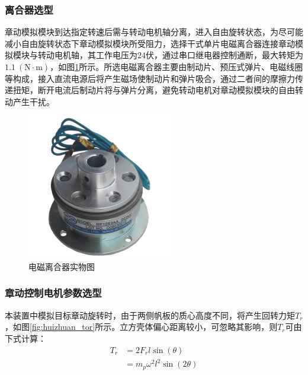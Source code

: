 \documentclass[lang=chs, degree=master, blindreview=false, winfonts=true]{yanputhesis}
\begin{document}
\subsubsection{离合器选型}
章动模拟模块到达指定转速后需与转动电机轴分离，进入自由旋转状态，为尽可能减小自由旋转状态下章动模拟模块所受阻力，选择干式单片电磁离合器连接章动模拟模块与转动电机轴，其工作电压为$24$伏，通过串口继电器控制通断，最大转矩为$1.1\ (\mathrm{N \cdot m})$，如图\ref{fig:diancilihe}所示。所选电磁离合器主要由制动片、预压式弹片、电磁线圈等构成，接入直流电源后将产生磁场使制动片和弹片吸合，通过二者间的摩擦力传递扭矩，断开电流后制动片将与弹片分离，避免转动电机对章动模拟模块的自由转动产生干扰。
\begin{figure}[ht]
	\centering
	\includegraphics[width = 2.5in]{picture/diancilihe.jpg}
	\caption{电磁离合器实物图}
	\label{fig:diancilihe}
\end{figure}

\subsubsection{章动控制电机参数选型}
本装置中模拟目标章动旋转时，由于两侧帆板的质心高度不同，将产生回转力矩$T_{r}$，如图\ref{fig:huizhuan_tor}所示。立方壳体偏心距离较小，可忽略其影响，则$T_{r}$可由下式计算：
\begin{equation}
	\begin{aligned}
		\label{Tor_r}
		T_{r}&=2F_{r}l\sin(\theta)\\
		&=m_{p}\omega^{2}l^{2}\sin(2\theta)
	\end{aligned}
\end{equation}
\end{document}

